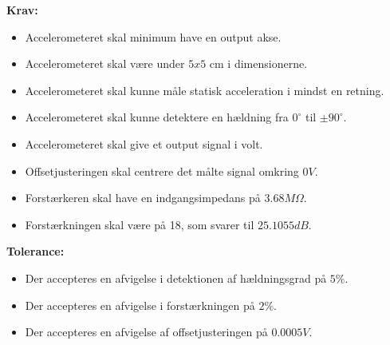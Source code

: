 \noindent\textbf{Krav:}
\begin{itemize}
	\item Accelerometeret skal minimum have en output akse.%
	\item Accelerometeret skal være under $5x5$ cm i dimensionerne.%
	\item Accelerometeret skal kunne måle statisk acceleration i mindst en retning.
	\item Accelerometeret skal kunne detektere en hældning fra $0^{\circ}$ til $\pm90^{\circ}$.
	\item Accelerometeret skal give et output signal i volt.
	\item Offsetjusteringen skal centrere det målte signal omkring $0V$.
	\item Forstærkeren skal have en indgangsimpedans på $3.68M\Omega$.%
	\item Forstærkningen skal være på 18, som svarer til $25.1055dB$.
\end{itemize}
\textbf{Tolerance:}
\begin{itemize}
	\item Der accepteres en afvigelse i detektionen af hældningsgrad på $5\%$.
	\item Der accepteres en afvigelse i forstærkningen på $2\%$.
	\item Der accepteres en afvigelse af offsetjusteringen på $0.0005V$.
\end{itemize}
